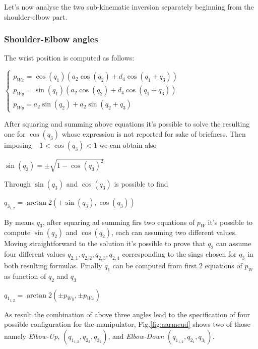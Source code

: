 Let's now analyse the two sub-kinematic inversion separately beginning from the shoulder-elbow part.

\subsubsection{Shoulder-Elbow angles}
\label{ssec:seangle}
The wrist position is computed as follows:

\begin{center}
	$\begin{cases}
		p_{Wx}=\cos{(q_1)}\left(a_2\cos{(q_2)}+d_4\cos{(q_1+q_3)}\right)\\
		p_{Wy}=\sin{(q_1)}\left(a_2\cos{(q_2)}+d_4\cos{(q_1+q_3)}\right)\\
 		p_{Wy}=a_2\sin{(q_2)}+a_2\sin{(q_2+q_3)}
	\end{cases}$
\end{center}

After squaring and summing above equations it's possible to solve the resulting one for $\cos(q_3)$ whose expression is not reported for sake of briefness. Then imposing $-1<\cos(q_3)<1$ we can obtain also 
\begin{center}
	$\sin(q_3) = \pm\sqrt{1 - \cos(q_3)^2}$
\end{center}
Through $\sin(q_3)$ and $\cos(q_3)$ is possible to find
\begin{center}
	 $q_{3_{1,2}} = \arctan2(\pm\sin{(q_3)},\cos{(q_3)})$
\end{center}
By means $q_3$, after squaring ad summing firs two equations of $p_W$ it's possible to compute $\sin(q_2)$ and $\cos(q_2)$, each can assuming two different values. Moving straightforward to the solution it's possible to prove that $q_2$ can assume four different values $q_{2,1}, q_{2,2}, q_{2,3}, q_{2,4}$ corresponding to the sings chosen for $q_3$ in both resulting formulas.\newline
Finally $q_1$ can be computed from first 2 equations of $p_W$ as function of $q_2$ and $q_3$
\begin{center}
	$q_{1_{1,2}} = \arctan2(\pm p_{Wy},\pm p_{Wx}) $
\end{center}
As result the combination of above three angles lead to the specification of four possible configuration for the manipulator, Fig.\ref*{fig:aarmeud} shows two of those namely \textit{Elbow-Up}, $\left(q_{1_{1,2}},q_{2_3},q_{3_2}\right)$, and \textit{Elbow-Down} $(q_{1_{1,2}},q_{2_1},q_{3_1})$.

